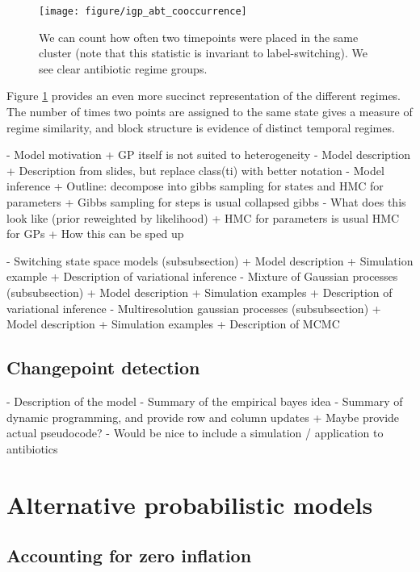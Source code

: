 \documentclass{article}
\begin{document}
\begin{figure}[ht]
  \centering
  \texttt{[image: figure/igp\_abt\_cooccurrence]}
  \caption{We can count how often two timepoints were placed in the same cluster
    (note that this statistic is invariant to label-switching). We see clear
    antibiotic regime groups. \label{fig:igp_abt_cooccurrence}}
\end{figure}

Figure \ref{fig:igp_abt_cooccurrence} provides an even more succinct
representation of the different regimes. The number of times two points are
assigned to the same state gives a measure of regime similarity, and block
structure is evidence of distinct temporal regimes.

- Model motivation
    + GP itself is not suited to heterogeneity
- Model description
    + Description from slides, but replace class(ti) with better notation
- Model inference
    + Outline: decompose into gibbs sampling for states and HMC for parameters
    + Gibbs sampling for steps is usual collapsed gibbs
      - What does this look like (prior reweighted by likelihood)
    + HMC for parameters is usual HMC for GPs
    + How this can be sped up

- Switching state space models (subsubsection)
   + Model description
   + Simulation example
   + Description of variational inference
- Mixture of Gaussian processes (subsubsection)
  + Model description
  + Simulation examples
  + Description of variational inference
- Multiresolution gaussian processes (subsubsection)
  + Model description
  + Simulation examples
  + Description of MCMC

\subsection{Changepoint detection}

- Description of the model
- Summary of the empirical bayes idea
- Summary of dynamic programming, and provide row and column updates
  + Maybe provide actual pseudocode?
- Would be nice to include a simulation / application to antibiotics


\section{Alternative probabilistic models}
\label{sec:alternative_probabilistic_models}
\subsection{Accounting for zero inflation}
\end{document}

